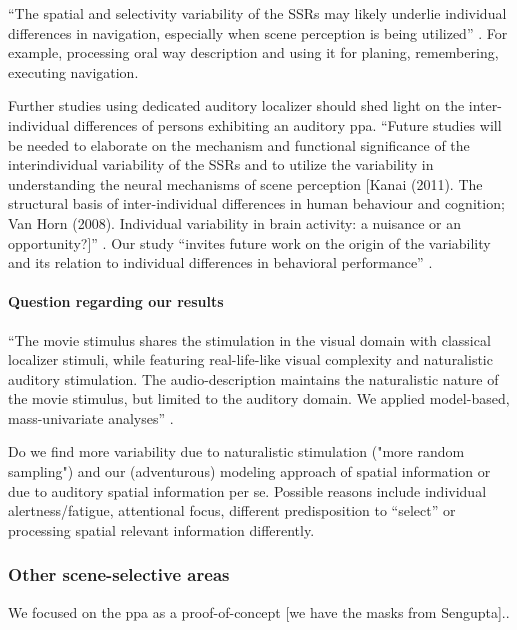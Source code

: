 %
``The spatial and selectivity variability of the SSRs may likely underlie
individual differences in navigation, especially when scene perception is being
utilized'' \citep{zhen2017quantifying}.
%
For example, processing oral way description and using it for planing,
remembering, executing navigation.

%
Further studies using dedicated auditory localizer should shed light on the
inter-individual differences of persons exhibiting an auditory \ac{ppa}.
%
``Future studies will be needed to elaborate on the mechanism and functional
significance of the interindividual variability of the SSRs and to utilize the
variability in understanding the neural mechanisms of scene perception [Kanai
(2011). The structural basis of inter-individual differences in human behaviour
and cognition; Van Horn (2008). Individual variability in brain activity: a
nuisance or an opportunity?]'' \citep{zhen2017quantifying}.
%
Our study ``invites future work on the origin of the variability and its
relation to individual differences in behavioral performance''
\citep{zhen2015quantifying}.


\paragraph{Question regarding our results}

``The movie stimulus shares the stimulation in the visual domain with classical
localizer stimuli, while featuring real-life-like visual complexity and
naturalistic auditory stimulation.
%
The audio-description maintains the naturalistic nature of the movie stimulus,
but limited to the auditory domain. We applied model-based, mass-univariate
analyses'' \citep{haeusler2022processing}.

%
Do we find more variability due to naturalistic stimulation ("more random
sampling") and our (adventurous) modeling approach of spatial information or due
to auditory spatial information per se.
%
Possible reasons include individual alertness/fatigue, attentional focus,
different predisposition to ``select'' or processing spatial relevant
information differently.


\subsubsection{Other scene-selective areas}


We focused on the \ac{ppa} as a proof-of-concept [we have the masks from
Sengupta]..


